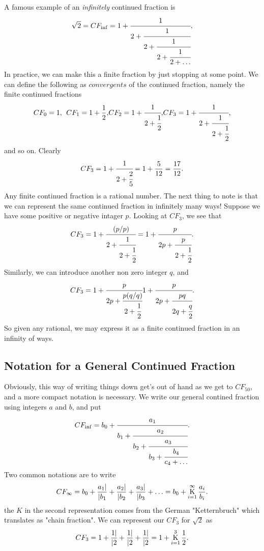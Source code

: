 \documentclass[16pt]{article}
\numberwithin{equation}{section}
\numberwithin{figure}{section}
\numberwithin{figure}{section}
\numberwithin{equation}{section}
\newcommand{\K}{\operatornamewithlimits{K}}
\begin{document}
A famous  example of an {\it infinitely} continued fraction is 
\begin{equation}
\sqrt{2}=CF_{\inf}=1+\cfrac{1}{2+\cfrac{1}{2+\cfrac{1}{2+\cfrac{1}{2+\ldots}}}},
\end{equation}
In practice, we can make this a finite fraction by just stopping at some point.
We can define the following as $convergents$ of the continued fraction, namely
the finite continued fractions
\begin{equation}
CF_{0}=1, \> \> CF_{1}=1+\frac{1}{2},
$$   $$
CF_{2}=1+\cfrac{1}{2+\cfrac{1}{2}},
$$   $$
CF_{3}=1+\cfrac{1}{2+\cfrac{1}{2+\cfrac{1}{2}}},
\label{Sea3}
\end{equation}
and so on.  Clearly
\begin{equation}
CF_{3}=1+\cfrac{1}{2+\cfrac{2}{5} }=1+\frac{5}{12}=\frac{17}{12}.
\end{equation}
Any finite continued fraction is a rational number. The next thing to note is that we can represent
the same continued fraction in infinitely many ways! Suppose we have some positive or negative 
intager  $p$. Looking at $CF_3$, we see that
\begin{equation}
CF_{3}=1+\cfrac{(p/p)}{2+\cfrac{1}{2+\cfrac{1}{2}}}=1+\cfrac{p}{2p+\cfrac{p}{2+\cfrac{1}{2}}}.
\end{equation}
Similarly, we can introduce another non zero integer $q$, and
\begin{equation}
CF_{3}=1+\cfrac{p}{2p+\cfrac{p (q/q)}{2+\cfrac{1}{2}}}1+\cfrac{p}{2p+\cfrac{p q}{2q+\cfrac{q}{2}}}.
\end{equation}
So given any rational, we may express it as a finite continued fraction in an infinity of ways.

\subsection{Notation for a General Continued Fraction}

Obviously, this way of writing things down get's out of hand as we get to $CF_{50}$, and a more compact
notation is necessary. We write our general contined fraction using integers $a$ and $b$, and put
\begin{equation}
CF_{\inf}=b_0+\cfrac{a_1}{b_1+\cfrac{a_2}{b_2+\cfrac{a_3}{b_3+\cfrac{b_4}{c_4+\ldots}}}}.
\end{equation}
Two common notations are to write
\begin{equation}
CF_{\infty}=b_0 +\frac{a_1 \vert}{\vert b_1}+\frac{a_2 \vert}{\vert b_2}
+\frac{a_3 \vert}{\vert b_3}+\ldots
=b_0+\K_{i=1}^\infty \frac{a_i}{b_i}.
\end{equation}
the $K$ in the second representation comes from the German "Ketternbruch" which translates as
"chain fraction". We can represent our $CF_3$ for $\sqrt{2}$ as
\begin{equation}
CF_{3}=1 +\frac{1 \vert}{\vert 2}+\frac{1 \vert}{\vert 2}
+\frac{1 \vert}{\vert 2}
=1+\K_{i=1}^3 \frac{1}{2}.
\end{equation}
\end{document}
